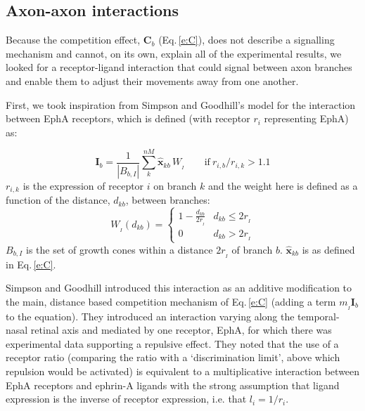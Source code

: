 \documentclass[11pt, a4paper]{article}
\begin{document}
\subsection*{Axon-axon interactions}

Because the competition effect, $\mathbf{C}_b$ (Eq.\,\ref{e:C}), does not
describe a signalling mechanism and cannot, on its own, explain all of the
experimental results, we looked for a receptor-ligand interaction that could
signal between axon branches and enable them to adjust their movements away
from one another.

First, we took inspiration from Simpson and Goodhill's model for the
interaction between EphA receptors, which is defined (with receptor $r_i$
representing EphA) as:

%
\begin{equation}
\mathbf{I}_b
= \frac{1}{|B_{b,I}|} \sum_k^{nM} \hat{\mathbf{x}}_{kb}\,W_{\!_I} \qquad \mathrm{if}~r_{i,b}
/ r_{i,k} > 1.1
\end{equation}
%
$r_{i,k}$ is the expression of receptor $i$ on branch $k$ and the weight here
is defined as a function of the distance, $d_{kb}$, between branches:
%
\begin{equation} \label{e:WI}
W_{\!_I}(d_{kb}) = \begin{cases}
      1 - \frac{d_{kb}}{2r_{\!_I}}   & d_{kb} \leq 2r_{\!_I} \\
     0 & d_{kb} > 2r_{\!_I}
     \end{cases}
\end{equation}
%
$B_{b,I}$ is the set of growth cones within a distance $2r_{\!_I}$ of branch
$b$. $\hat{\mathbf{x}}_{kb}$ is as defined in Eq.\,\ref{e:C}.

Simpson and Goodhill introduced this interaction as an additive modification
to the main, distance based competition mechanism of Eq.\,\ref{e:C} (adding a
term $m_{\!_I} \mathbf{I}_b$ to the equation). They introduced an interaction
varying along the temporal-nasal retinal axis and mediated by one receptor,
EphA, for which there was experimental data supporting a repulsive
effect. They noted that the use of a receptor ratio (comparing the ratio with
a `discrimination limit', above which repulsion would be activated) is
equivalent to a multiplicative interaction between EphA receptors and ephrin-A
ligands with the strong assumption that ligand expression is the inverse of
receptor expression, i.e. that $l_i = 1/r_i$.
\end{document}
